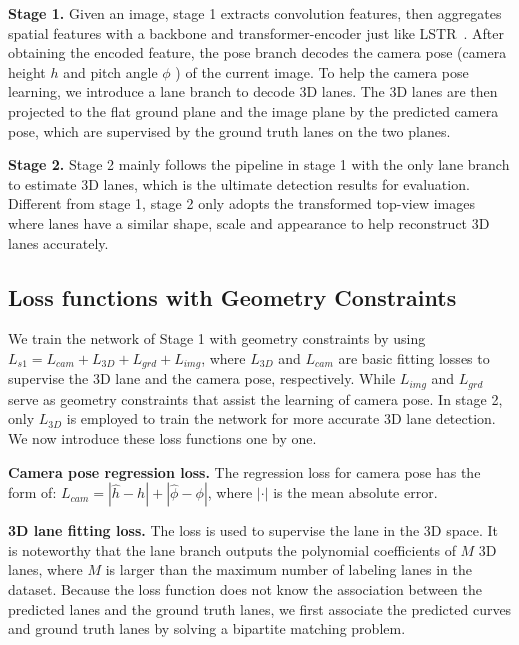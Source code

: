 \documentclass[letterpaper]{article} \usepackage{aaai22}  \usepackage{times}  \usepackage{helvet}  \usepackage{courier}  \usepackage[hyphens]{url}  \usepackage{graphicx} \urlstyle{rm} \def\UrlFont{\rm}  \usepackage{natbib}  \usepackage{caption}
\begin{document}
\noindent \textbf{Stage 1.}
Given an image, stage 1 extracts convolution features, then aggregates spatial features with a backbone and transformer-encoder just like LSTR~\cite{LSTR}. After obtaining the encoded feature, the pose branch decodes the camera pose (camera height $h$ and pitch angle $\phi$ ) of the current image. To help the camera pose learning, we introduce a lane branch to decode 3D lanes. The 3D lanes are then projected to the flat ground plane and the image plane by the predicted camera pose, which are supervised by the ground truth lanes on the two planes.


\noindent \textbf{Stage 2.} 
Stage 2 mainly follows the pipeline in stage 1 with the only lane branch to estimate 3D lanes, which is the ultimate detection results for evaluation. Different from stage 1,  stage 2 only adopts the transformed top-view images where lanes have a similar shape, scale and appearance to help reconstruct 3D lanes accurately.


\subsection{Loss functions with Geometry Constraints}

We train the network of Stage 1 with geometry constraints by using $L_{s1} = L_{cam}+L_{3D}+L_{grd}+L_{img}$, where $L_{3D}$ and $L_{cam}$ are basic fitting losses to supervise the 3D lane and the camera pose, respectively. While $L_{img}$ and $L_{grd}$ serve as geometry constraints that assist the learning of camera pose. In stage 2, only $L_{3D}$ is employed to train the network for more accurate 3D lane detection. We now introduce these loss functions one by one. 


\noindent \textbf{Camera pose regression loss.}
The regression loss for camera pose has the form of: $L_{cam} = \left|\hat{h}-h\right| + \left|\hat{\phi}-\phi\right|$, where $\left|\cdot\right|$ is the mean absolute error.



\noindent \textbf{3D lane fitting loss.}
The loss is used to supervise the lane in the 3D space. It is noteworthy that the lane branch outputs the polynomial coefficients of $M$ 3D lanes,  where $M$ is larger than the maximum number of labeling lanes in the dataset. Because the loss function does not know the association between the predicted lanes and the ground truth lanes, we first associate the predicted curves and ground truth lanes by solving a bipartite matching problem.
\end{document}

